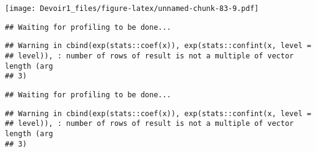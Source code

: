 \documentclass[]{article}
\newenvironment{Shaded}{\begin{snugshade}}{\end{snugshade}}
\newcommand{\KeywordTok}[1]{\textcolor[rgb]{0.13,0.29,0.53}{\textbf{#1}}}
\newcommand{\DataTypeTok}[1]{\textcolor[rgb]{0.13,0.29,0.53}{#1}}
\newcommand{\DecValTok}[1]{\textcolor[rgb]{0.00,0.00,0.81}{#1}}
\newcommand{\StringTok}[1]{\textcolor[rgb]{0.31,0.60,0.02}{#1}}
\newcommand{\OperatorTok}[1]{\textcolor[rgb]{0.81,0.36,0.00}{\textbf{#1}}}
\newcommand{\NormalTok}[1]{#1}
\begin{document}
\texttt{[image: Devoir1\_files/figure-latex/unnamed-chunk-83-9.pdf]}

\begin{Shaded}
\end{Shaded}

\begin{verbatim}
## Waiting for profiling to be done...
\end{verbatim}

\begin{verbatim}
## Warning in cbind(exp(stats::coef(x)), exp(stats::confint(x, level =
## level)), : number of rows of result is not a multiple of vector length (arg
## 3)
\end{verbatim}

\begin{verbatim}
## Waiting for profiling to be done...
\end{verbatim}

\begin{verbatim}
## Warning in cbind(exp(stats::coef(x)), exp(stats::confint(x, level =
## level)), : number of rows of result is not a multiple of vector length (arg
## 3)
\end{verbatim}
\end{document}

